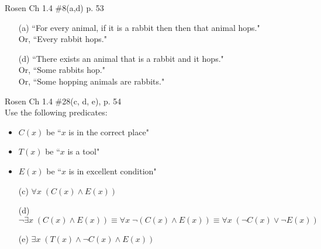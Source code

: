 \begin{questions}
 Rosen Ch 1.4 \#8(a,d)  p. 53 
    \ifprintanswers
        \vspace{-12pt}
    \fi
  \begin{solution}
      \begin{itemize}[itemsep=0pt,parsep=0pt,topsep=0pt,partopsep=0pt]
         \item[(a)] ``For every animal, if it is a rabbit then then that animal hops."  \\Or, ``Every rabbit hops."
          \item[(d)] ``There exists an animal that is a rabbit and it hops." \\Or, ``Some rabbits hop." \\Or, ``Some hopping animals are rabbits."
      \end{itemize}
  \end{solution}




\label{probA} Rosen Ch 1.4 \#28(c, d, e), p. 54 \\
Use the following predicates:
\begin{itemize}[itemsep=0pt,parsep=0pt,topsep=0pt,partopsep=0pt]
    \item $C(x)$ be ``$x$ is in the correct place"
    \item $T(x)$ be ``$x$ is a tool"
    \item $E(x)$ be ``$x$ is in excellent condition"
\end{itemize}
    \ifprintanswers
        \vspace{-12pt}
    \fi
  \begin{solution}
      \begin{itemize}[itemsep=0pt,parsep=0pt,topsep=0pt,partopsep=0pt]
          \item[(c)] $\forall x\; (C(x) \wedge E(x)) $
          \item[(d)] $\neg \exists x\; (C(x) \wedge E(x)) \equiv \forall x\; \neg (C(x) \wedge E(x)) \equiv \forall x\; (\neg C(x) \vee \neg E(x))$
          \item[(e)] $\exists x\; (T(x) \wedge \neg C(x) \wedge E(x))$
      \end{itemize}
  \end{solution}




\end{questions}
